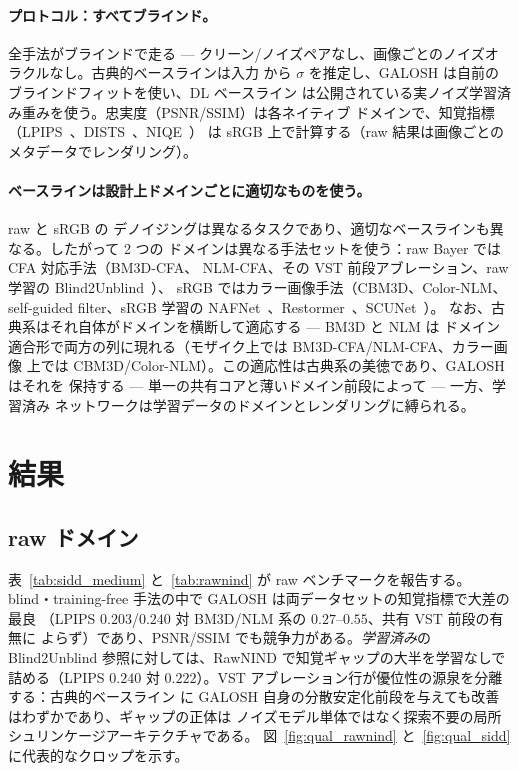 \documentclass[10pt,twocolumn]{article}
\begin{document}
\paragraph{プロトコル：すべてブラインド。} 全手法がブラインドで走る ---
クリーン/ノイズペアなし、画像ごとのノイズオラクルなし。古典的ベースラインは入力
から $\sigma$ を推定し、GALOSH は自前のブラインドフィットを使い、DL ベースライン
は公開されている実ノイズ学習済み重みを使う。忠実度（PSNR/SSIM）は各ネイティブ
ドメインで、知覚指標（LPIPS~\cite{lpips}、DISTS~\cite{dists}、NIQE~\cite{niqe}）
は sRGB 上で計算する（raw 結果は画像ごとのメタデータでレンダリング）。

\paragraph{ベースラインは設計上ドメインごとに適切なものを使う。} raw と sRGB の
デノイジングは異なるタスクであり、適切なベースラインも異なる。したがって 2 つの
ドメインは異なる手法セットを使う：raw Bayer では CFA 対応手法（BM3D-CFA、
NLM-CFA、その VST 前段アブレーション、raw 学習の Blind2Unblind~\cite{b2u}）、
sRGB ではカラー画像手法（CBM3D、Color-NLM、self-guided filter、sRGB 学習の
NAFNet~\cite{nafnet}、Restormer~\cite{restormer}、SCUNet~\cite{scunet}）。
なお、古典系はそれ自体がドメインを横断して適応する --- BM3D と NLM は
ドメイン適合形で両方の列に現れる（モザイク上では BM3D-CFA/NLM-CFA、カラー画像
上では CBM3D/Color-NLM）。この適応性は古典系の美徳であり、GALOSH はそれを
保持する --- 単一の共有コアと薄いドメイン前段によって --- 一方、学習済み
ネットワークは学習データのドメインとレンダリングに縛られる。

\section{結果}\label{sec:results}

\subsection{raw ドメイン}\label{sec:rawres}
表~\ref{tab:sidd_medium} と~\ref{tab:rawnind} が raw ベンチマークを報告する。
blind・training-free 手法の中で GALOSH は両データセットの知覚指標で大差の最良
（LPIPS $0.203$/$0.240$ 対 BM3D/NLM 系の $0.27$--$0.55$、共有 VST 前段の有無に
よらず）であり、PSNR/SSIM でも競争力がある。\emph{学習済み}の Blind2Unblind
参照に対しては、RawNIND で知覚ギャップの大半を学習なしで詰める（LPIPS $0.240$
対 $0.222$）。VST アブレーション行が優位性の源泉を分離する：古典的ベースライン
に GALOSH 自身の分散安定化前段を与えても改善はわずかであり、ギャップの正体は
ノイズモデル単体ではなく探索不要の局所シュリンケージアーキテクチャである。
図~\ref{fig:qual_rawnind} と~\ref{fig:qual_sidd} に代表的なクロップを示す。
\end{document}
